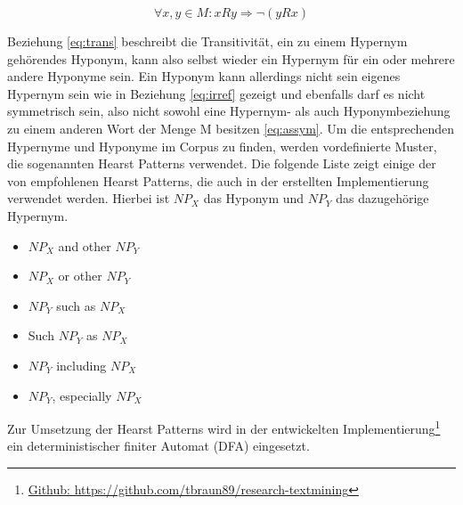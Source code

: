 \begin{equation}
  \label{eq:assym}
  \forall x, y \in M : xRy \Rightarrow \neg (yRx)
\end{equation}

Beziehung \ref{eq:trans} beschreibt die Transitivität, ein zu einem Hypernym gehörendes Hyponym, 
kann also selbst wieder ein Hypernym für ein oder mehrere andere Hyponyme sein.
Ein Hyponym kann allerdings nicht sein eigenes Hypernym sein wie in Beziehung \ref{eq:irref} gezeigt und ebenfalls darf es
nicht symmetrisch sein, also nicht sowohl eine Hypernym- als auch Hyponymbeziehung zu einem anderen Wort
der Menge M besitzen \ref{eq:assym}.
Um die entsprechenden Hypernyme und Hyponyme im Corpus zu finden, werden vordefinierte Muster, die sogenannten Hearst Patterns
verwendet. Die folgende Liste zeigt einige der von \cite{bib:Snow2004} empfohlenen Hearst Patterns, die auch in der erstellten
Implementierung verwendet werden. Hierbei ist $NP_{X}$ das Hyponym und $NP_{Y}$ das dazugehörige Hypernym.

\begin{itemize}
\item $NP_{X}$ and other $NP_{Y}$
\item $NP_{X}$ or other $NP_{Y}$
\item $NP_{Y}$ such as $NP_{X}$
\item Such $NP_{Y}$ as $NP_{X}$
\item $NP_{Y}$ including $NP_{X}$
\item $NP_{Y}$, especially $NP_{X}$
\end{itemize}

Zur Umsetzung der Hearst Patterns wird in der entwickelten Implementierung\footnote{\href{https://github.com/tbraun89/research-textmining}{Github:
 https://github.com/tbraun89/research-textmining}} ein deterministischer finiter Automat (DFA) eingesetzt. 
